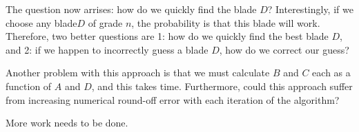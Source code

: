 \documentclass[12pt]{article}
\begin{document}
The question now arrises: how do we quickly find the blade $D$?  Interestingly, if we choose any blade$D$  of grade $n$,
the probability is that this blade will work.  Therefore, two better questions are 1: how do we quickly find the best blade $D$, and
2: if we happen to incorrectly guess a blade $D$, how do we correct our guess?

Another problem with this approach is that we must calculate $B$ and $C$ each as a function of $A$ and $D$,
and this takes time.  Furthermore, could this approach suffer from increasing numerical round-off error with
each iteration of the algorithm?

More work needs to be done.
\end{document}
